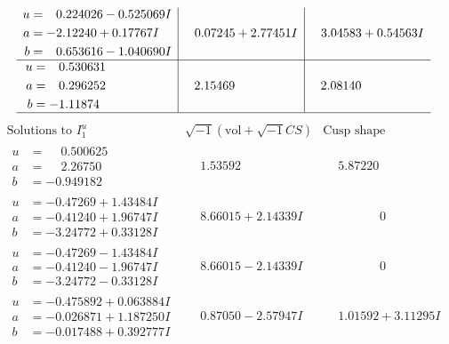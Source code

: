 \documentclass[1p]{elsarticle_modified}
\theoremstyle{definition}
\newcommand{\I}{\sqrt{-1}}
\begin{document}
$$\begin{array}{c|c|c}
\begin{aligned}
u &= \phantom{-}0.224026 - 0.525069 I \\
a &= -2.12240 + 0.17767 I \\
b &= \phantom{-}0.653616 - 1.040690 I\end{aligned}
 & \phantom{-}0.07245 + 2.77451 I & \phantom{-}3.04583 + 0.54563 I \\ \hline\begin{aligned}
u &= \phantom{-}0.530631\phantom{ +0.000000I} \\
a &= \phantom{-}0.296252\phantom{ +0.000000I} \\
b &= -1.11874\phantom{ +0.000000I}\end{aligned}
 & \phantom{-}2.15469\phantom{ +0.000000I} & \phantom{-}2.08140\phantom{ +0.000000I}\\
 \hline 
 \end{array}$$\newpage$$\begin{array}{c|c|c}  
\text{Solutions to }I^u_{1}& \I (\text{vol} + \sqrt{-1}CS) & \text{Cusp shape}\\
 \hline 
\begin{aligned}
u &= \phantom{-}0.500625\phantom{ +0.000000I} \\
a &= \phantom{-}2.26750\phantom{ +0.000000I} \\
b &= -0.949182\phantom{ +0.000000I}\end{aligned}
 & \phantom{-}1.53592\phantom{ +0.000000I} & \phantom{-}5.87220\phantom{ +0.000000I} \\ \hline\begin{aligned}
u &= -0.47269 + 1.43484 I \\
a &= -0.41240 + 1.96747 I \\
b &= -3.24772 + 0.33128 I\end{aligned}
 & \phantom{-}8.66015 + 2.14339 I & \phantom{-0.000000 } 0 \\ \hline\begin{aligned}
u &= -0.47269 - 1.43484 I \\
a &= -0.41240 - 1.96747 I \\
b &= -3.24772 - 0.33128 I\end{aligned}
 & \phantom{-}8.66015 - 2.14339 I & \phantom{-0.000000 } 0 \\ \hline\begin{aligned}
u &= -0.475892 + 0.063884 I \\
a &= -0.026871 + 1.187250 I \\
b &= -0.017488 + 0.392777 I\end{aligned}
 & \phantom{-}0.87050 - 2.57947 I & \phantom{-}1.01592 + 3.11295 I \\ \hline\begin{aligned}

\end{aligned}
\end{array}$$
\end{document}

